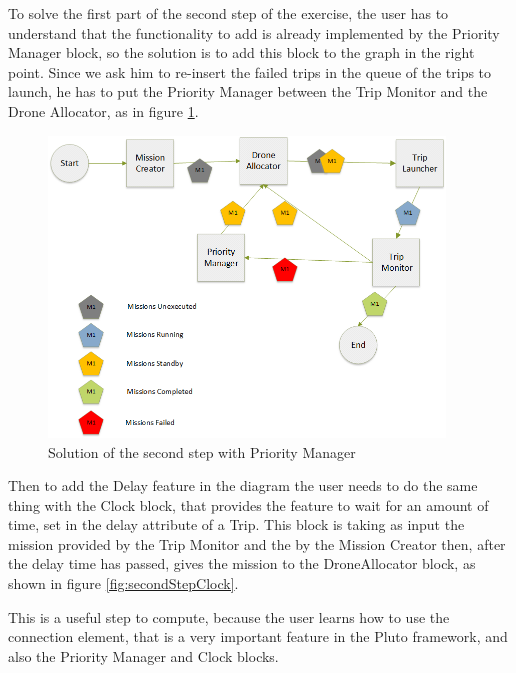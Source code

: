 \newpage

To solve the first part of the second step of the exercise, the user has to understand that the functionality to add is already implemented by the Priority Manager block, so the solution is to add this block to the graph in the right point.
Since we ask him to re-insert the failed trips in the queue of the trips to launch, he has to put the Priority Manager between the Trip Monitor and the Drone Allocator, as in figure \ref{fig:secondStepPriority}.
\\

\begin{figure}[htb]
  \centering
  \includegraphics[width=\linewidth,height=8cm]{pictures/secondStep.png}
  \caption{Solution of the second step with Priority Manager}
  \label{fig:secondStepPriority}
\end{figure}

Then to add the Delay feature in the diagram the user needs to do the same thing with the Clock block, that provides the feature to wait for an amount of time, set in the delay attribute of a Trip. This block is taking as input the mission provided by the Trip Monitor and the by the Mission Creator then, after the delay time has passed, gives the mission to the DroneAllocator block, as shown in figure \ref{fig:secondStepClock}.

This is a useful step to compute, because the user learns how to use the connection element, that is a very important feature in the Pluto framework, and also the Priority Manager and Clock blocks.
\\

